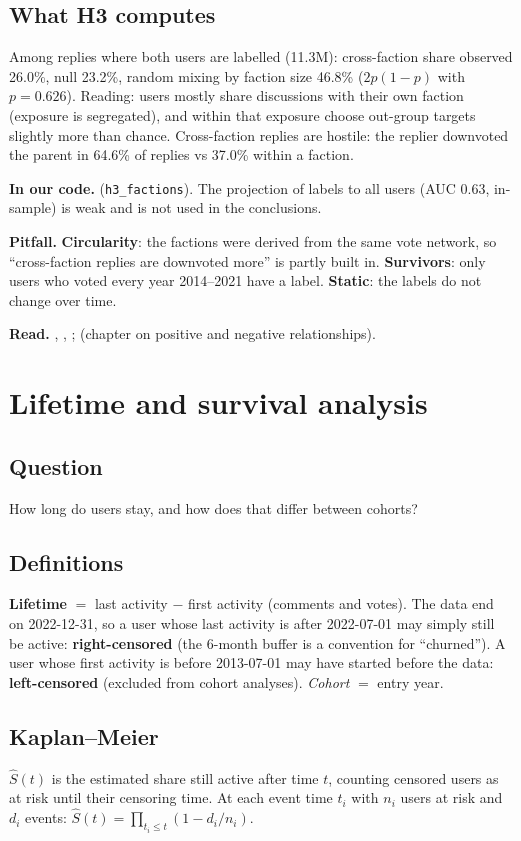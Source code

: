 \documentclass[11pt,a4paper]{article}
\newcommand{\file}[1]{\path{#1}}
\newcommand{\inour}[1]{\par\textbf{In our code.} #1}
\newcommand{\pitfall}[1]{\par\textbf{Pitfall.} #1}
\newcommand{\readref}[1]{\par\textbf{Read.} #1}
\begin{document}
\subsection*{What H3 computes}
Among replies where both users are labelled (11.3M): cross-faction share observed 26.0\%, null 23.2\%, random mixing by faction size 46.8\% ($2p(1-p)$ with $p=0.626$). Reading: users mostly share discussions with their own faction (exposure is segregated), and within that exposure choose out-group targets slightly more than chance. Cross-faction replies are hostile: the replier downvoted the parent in 64.6\% of replies vs 37.0\% within a faction.

\inour{\file{05_h2_h3_dyad_faction.py} (\texttt{h3\_factions}). The projection of labels to all users (AUC 0.63, in-sample) is weak and is not used in the conclusions.}
\pitfall{\textbf{Circularity}: the factions were derived from the same vote network, so ``cross-faction replies are downvoted more'' is partly built in. \textbf{Survivors}: only users who voted every year 2014--2021 have a label. \textbf{Static}: the labels do not change over time.}
\readref{\cite{heider}, \cite{cartwright}, \cite{faultana}; \cite{easley} (chapter on positive and negative relationships).}

\section{Lifetime and survival analysis}\label{sec:surv}
\subsection*{Question}
How long do users stay, and how does that differ between cohorts?

\subsection*{Definitions}
\textbf{Lifetime} $=$ last activity $-$ first activity (comments and votes). The data end on 2022-12-31, so a user whose last activity is after 2022-07-01 may simply still be active: \textbf{right-censored} (the 6-month buffer is a convention for ``churned''). A user whose first activity is before 2013-07-01 may have started before the data: \textbf{left-censored} (excluded from cohort analyses). \emph{Cohort} $=$ entry year.

\subsection*{Kaplan--Meier}
$\hat S(t)$ is the estimated share still active after time $t$, counting censored users as at risk until their censoring time. At each event time $t_i$ with $n_i$ users at risk and $d_i$ events: $\hat S(t)=\prod_{t_i\le t}(1-d_i/n_i)$.
\end{document}
